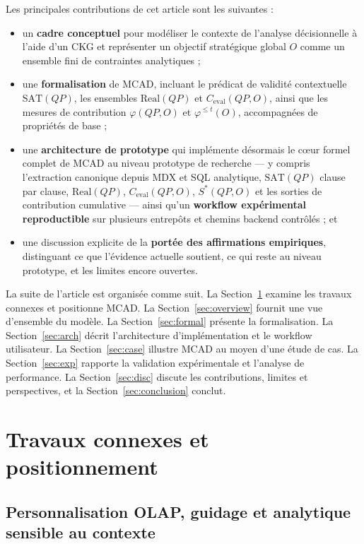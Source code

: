 \documentclass[journal]{IEEEtran}
\begin{document}
Les principales contributions de cet article sont les suivantes :
\begin{itemize}
  \item un \textbf{cadre conceptuel} pour modéliser le contexte de l'analyse décisionnelle à l'aide d'un CKG et représenter un objectif stratégique global $O$ comme un ensemble fini de contraintes analytiques ;
  \item une \textbf{formalisation} de MCAD, incluant le prédicat de validité contextuelle $\mathrm{SAT}(QP)$, les ensembles $\mathrm{Real}(QP)$ et $C_{\mathrm{eval}}(QP,O)$, ainsi que les mesures de contribution $\varphi(QP,O)$ et $\varphi^{\le t}(O)$, accompagnées de propriétés de base ;
  \item une \textbf{architecture de prototype} qui implémente désormais le cœur formel complet de MCAD au niveau prototype de recherche --- y compris l'extraction canonique depuis MDX et SQL analytique, $\mathrm{SAT}(QP)$ clause par clause, $\mathrm{Real}(QP)$, $C_{\mathrm{eval}}(QP,O)$, $S^*(QP,O)$ et les sorties de contribution cumulative --- ainsi qu'un \textbf{workflow expérimental reproductible} sur plusieurs entrepôts et chemins backend contrôlés ; et
  \item une discussion explicite de la \textbf{portée des affirmations empiriques}, distinguant ce que l'évidence actuelle soutient, ce qui reste au niveau prototype, et les limites encore ouvertes.
\end{itemize}

La suite de l'article est organisée comme suit. La Section~\ref{sec:related} examine les travaux connexes et positionne MCAD. La Section~\ref{sec:overview} fournit une vue d'ensemble du modèle. La Section~\ref{sec:formal} présente la formalisation. La Section~\ref{sec:arch} décrit l'architecture d'implémentation et le workflow utilisateur. La Section~\ref{sec:case} illustre MCAD au moyen d'une étude de cas. La Section~\ref{sec:exp} rapporte la validation expérimentale et l'analyse de performance. La Section~\ref{sec:disc} discute les contributions, limites et perspectives, et la Section~\ref{sec:conclusion} conclut.

\section{Travaux connexes et positionnement}
\label{sec:related}

\subsection{Personnalisation OLAP, guidage et analytique sensible au contexte}
\end{document}
